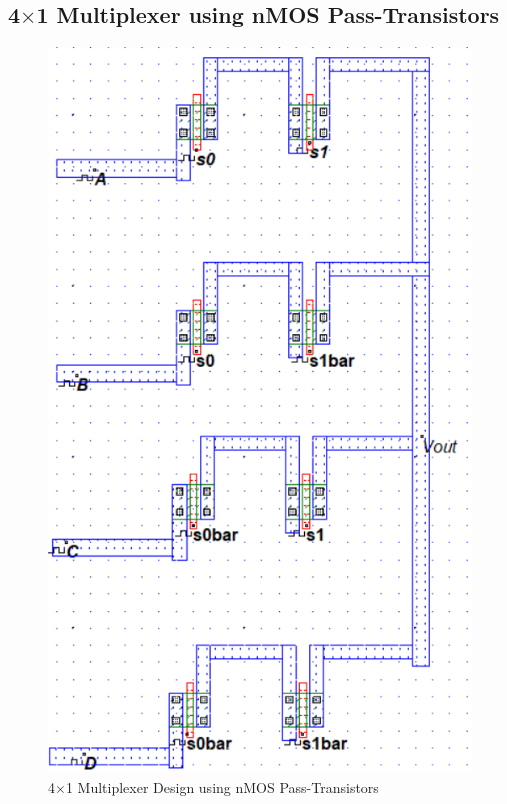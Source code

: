 \documentclass[a4paper,12pt]{article}
\begin{document}
	\subsection{4$\times$1 Multiplexer using nMOS Pass-Transistors}
	\begin{figure}[H]
		\centering
		\includegraphics[width=0.81\linewidth]{Images/6}
		\caption{4$\times$1 Multiplexer Design using nMOS Pass-Transistors}
		\label{fig:1}
	\end{figure}
	\newpage
	
\end{document}

